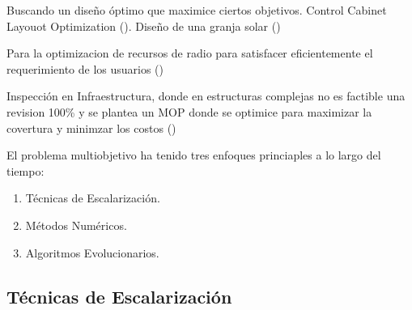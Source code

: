 Buscando un diseño \'optimo que maximice ciertos objetivos. Control Cabinet Layouot Optimization (\cite{pllana2019customizing}). Diseño de una granja solar (\cite{ganesan2013hypervolume})

Para la optimizacion de recursos de radio para satisfacer eficientemente el requerimiento de los usuarios (\cite{bjornson2013optimal})

Inspecci\'on en Infraestructura, donde en estructuras complejas no es factible una revision 100\% y se plantea un MOP donde se optimice para maximizar la covertura y minimzar los costos (\cite{ellefsen2017multiobjective})


El problema multiobjetivo ha tenido tres enfoques princiaples a lo largo del tiempo:
\begin{enumerate}
    \item T\'ecnicas de Escalarizaci\'on.
    \item M\'etodos Num\'ericos.
    \item Algoritmos Evolucionarios.
\end{enumerate}



\subsection{T\'ecnicas de Escalarizaci\'on }

